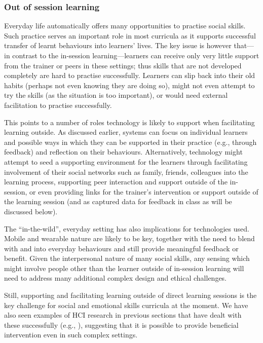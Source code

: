 \documentclass[prodmode,acmtochi]{acmsmall}
\newcommand{\todo}[1]{\textrm{\textrm{\textcolor{LightBlue}{[[#1]]}}}}
\begin{document}
\subsubsection{Out of session learning}
Everyday life automatically offers many opportunities to practise social skills. Such practice serves an important role in most curricula as it supports successful transfer of learnt behaviours into learners' lives. 
%
The key issue is however that---in contrast to the in-session learning---learners can receive only very little support from the trainer or peers in these settings; thus skills that are not developed completely are hard to practise successfully. Learners can slip back into their old habits (perhaps not even knowing they are doing so), might not even attempt to try the skills (as the situation is too important), or would need external facilitation to practise successfully.  

This points to a number of roles technology is likely to support when facilitating learning outside. As discussed earlier, systems can focus on individual learners and possible ways in which they can be supported in their practice (e.g., through feedback) and reflection on their behaviours. Alternatively, technology might attempt to seed a supporting environment for the learners through facilitating involvement of their social networks such as family, friends, colleagues into the learning process, supporting peer interaction and support outside of the in-session, or even providing links for the trainer's intervention or support outside of the learning session (and as captured data for feedback in class as will be discussed below). 

The ``in-the-wild'', everyday setting has also implications for technologies used. Mobile and wearable nature are likely to be key, together with the need to blend with and into everyday behaviours %
and still provide meaningful feedback or benefit. Given the interpersonal nature of many social skills, any sensing which might involve people other than the learner outside of in-session learning will need to address many additional complex design and ethical challenges. 

Still, supporting and facilitating learning outside of direct learning sessions is the key challenge for social and emotional skills curricula at the moment. We have also seen examples of HCI research in previous sections that have dealt with these successfully (e.g., \cite{Escobedo2012,Tentori2010,Matthews2011}), suggesting that it is possible to provide beneficial intervention even in such complex settings. 
\end{document}
